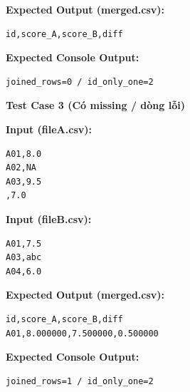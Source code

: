 \textbf{Expected Output (merged.csv):}
\begin{lstlisting}
id,score_A,score_B,diff
\end{lstlisting}

\textbf{Expected Console Output:}
\begin{lstlisting}
joined_rows=0 / id_only_one=2
\end{lstlisting}

\vspace{0.5cm}

\textbf{Test Case 3 (Có missing / dòng lỗi)}

\textbf{Input (fileA.csv):}
\begin{lstlisting}
A01,8.0
A02,NA
A03,9.5
,7.0
\end{lstlisting}

\textbf{Input (fileB.csv):}
\begin{lstlisting}
A01,7.5
A03,abc
A04,6.0
\end{lstlisting}

\textbf{Expected Output (merged.csv):}
\begin{lstlisting}
id,score_A,score_B,diff
A01,8.000000,7.500000,0.500000
\end{lstlisting}

\textbf{Expected Console Output:}
\begin{lstlisting}
joined_rows=1 / id_only_one=2
\end{lstlisting}